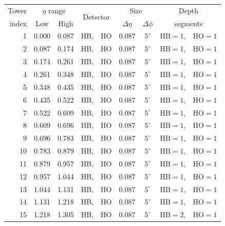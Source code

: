 \begin{table}
  \centering
  \small
  \begin{tabular}{r|c|c|cc|c|c|cc}
    Tower & \multicolumn{2}{c|}{$\eta$ range} & \multicolumn{2}{c|}{\multirow{2}{*}{Detector}} & \multicolumn{2}{c|}{Size} & \multicolumn{2}{c}{Depth} \\ 
    index & \multicolumn{1}{c}{Low} & High & & & \multicolumn{1}{c}{$\Delta\eta$} & $\Delta\phi$ & \multicolumn{2}{c}{segments} \\ 
    \hline\hline
    1  & 0.000 & 0.087 & HB, & HO & 0.087 & $5^{\circ}$  & $\text{HB} = 1$, & $\text{HO} = 1$ \\
    2  & 0.087 & 0.174 & HB, & HO & 0.087 & $5^{\circ}$  & $\text{HB} = 1$, & $\text{HO} = 1$ \\
    3  & 0.174 & 0.261 & HB, & HO & 0.087 & $5^{\circ}$  & $\text{HB} = 1$, & $\text{HO} = 1$ \\
    4  & 0.261 & 0.348 & HB, & HO & 0.087 & $5^{\circ}$  & $\text{HB} = 1$, & $\text{HO} = 1$ \\
    5  & 0.348 & 0.435 & HB, & HO & 0.087 & $5^{\circ}$  & $\text{HB} = 1$, & $\text{HO} = 1$ \\
    6  & 0.435 & 0.522 & HB, & HO & 0.087 & $5^{\circ}$  & $\text{HB} = 1$, & $\text{HO} = 1$ \\
    7  & 0.522 & 0.609 & HB, & HO & 0.087 & $5^{\circ}$  & $\text{HB} = 1$, & $\text{HO} = 1$ \\
    8  & 0.609 & 0.696 & HB, & HO & 0.087 & $5^{\circ}$  & $\text{HB} = 1$, & $\text{HO} = 1$ \\
    9  & 0.696 & 0.783 & HB, & HO & 0.087 & $5^{\circ}$  & $\text{HB} = 1$, & $\text{HO} = 1$ \\
    10 & 0.783 & 0.879 & HB, & HO & 0.087 & $5^{\circ}$  & $\text{HB} = 1$, & $\text{HO} = 1$ \\
    11 & 0.879 & 0.957 & HB, & HO & 0.087 & $5^{\circ}$  & $\text{HB} = 1$, & $\text{HO} = 1$ \\
    12 & 0.957 & 1.044 & HB, & HO & 0.087 & $5^{\circ}$  & $\text{HB} = 1$, & $\text{HO} = 1$ \\
    13 & 1.044 & 1.131 & HB, & HO & 0.087 & $5^{\circ}$  & $\text{HB} = 1$, & $\text{HO} = 1$ \\
    14 & 1.131 & 1.218 & HB, & HO & 0.087 & $5^{\circ}$  & $\text{HB} = 1$, & $\text{HO} = 1$ \\
    15 & 1.218 & 1.305 & HB, & HO & 0.087 & $5^{\circ}$  & $\text{HB} = 2$, & $\text{HO} = 1$ \\

\end{tabular}
\end{table}
